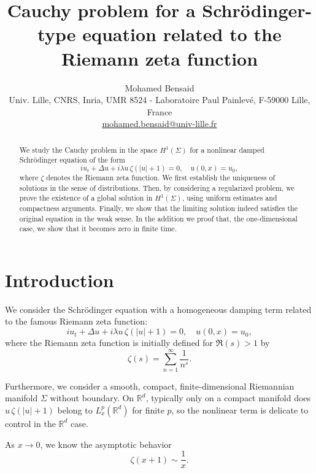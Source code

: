 \documentclass[10pt]{article}
\begin{document}
\title{Cauchy problem for a Schrödinger-type equation related to the Riemann zeta function} %
	\author{Mohamed Bensaid\\Univ. Lille, CNRS, Inria, UMR 8524 - Laboratoire Paul Painlevé, F-59000 Lille, France\\ \url{mohamed.bensaid@univ-lille.fr}}
\maketitle
\begin{abstract}
We study the Cauchy problem in the space $H^1(\Sigma)$ for a nonlinear damped Schrödinger equation of the form
\begin{equation}\tag{NLS-$\zeta$}\label{nls}
    i u_t + \Delta u + i \lambda u \, \zeta(|u|+1) = 0, \quad u(0,x) = u_0,
\end{equation}
where $\zeta$ denotes the Riemann zeta function. We first establish the uniqueness of solutions in the sense of distributions. Then, by considering a regularized problem, we prove the existence of a global solution in $H^1(\Sigma)$, using uniform estimates and compactness arguments. Finally, we show that the limiting solution indeed satisfies the original equation in the weak sense. In the addition we proof that, the one-dimensional case, we show that it becomes zero in finite time.
\end{abstract}


\section{Introduction}
We consider the Schr\"odinger equation with a homogeneous damping term related to the famous Riemann zeta function:
\begin{equation}\tag{NLS-$\zeta$}\label{nlss}
    i u_t + \Delta u + i \lambda u \, \zeta(|u|+1) = 0, \quad u(0,x) = u_0,
\end{equation}
where the Riemann zeta function is initially defined for $\Re(s) > 1$ by
\[
\zeta(s) = \sum_{n=1}^\infty \frac{1}{n^s}.
\]

Furthermore, we consider a smooth, compact, finite-dimensional Riemannian manifold $\Sigma$ without boundary. On $\mathbb{R}^d$, typically only on a compact manifold does 
$u \, \zeta(|u|+1)$ belong to $L^p_x(\mathbb{R}^d)$ for finite $p$, 
so the nonlinear term is delicate to control in the $\mathbb{R}^d$ case.

As $x \to 0$, we know the asymptotic behavior
\[
\zeta(x+1) \sim \frac{1}{x}.
\]
\end{document}
